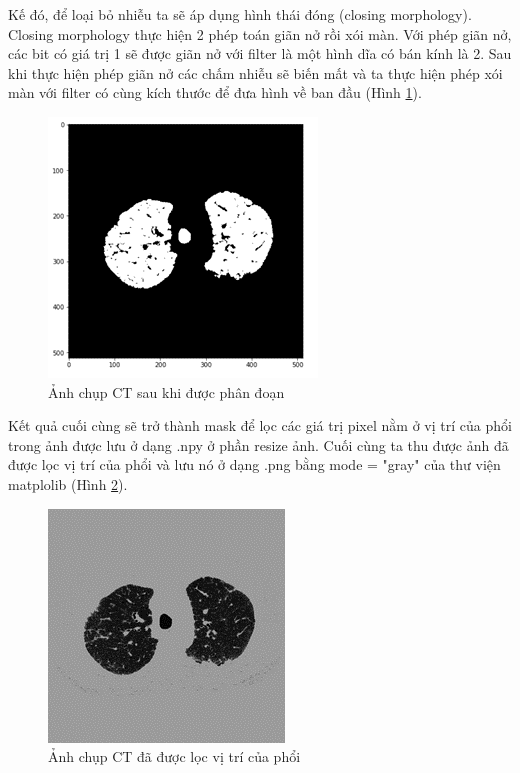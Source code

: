 Kế đó, để loại bỏ nhiễu ta sẽ áp dụng hình thái đóng (closing morphology). Closing morphology thực hiện 2 phép toán giãn nở rồi xói màn. Với phép giãn nở, các bit có giá trị 1 sẽ được giãn nở với filter là một hình dĩa có bán kính là 2. Sau khi thực hiện phép giãn nở các chấm nhiễu sẽ biến mất và ta thực hiện phép xói màn với filter có cùng kích thước để đưa hình về ban đầu (Hình \ref{fig:data9}).\par
\begin{figure}[ht!]
\centerline{\includegraphics[scale=0.6]{images/data9.png}}
\caption{Ảnh chụp CT sau khi được phân đoạn}
\label{fig:data9}
\end{figure}
Kết quả cuối cùng sẽ trở thành mask để lọc các giá trị pixel nằm ở vị trí của phổi trong ảnh được lưu ở dạng .npy ở phần resize ảnh. Cuối cùng ta thu được ảnh đã được lọc vị trí của phổi và lưu nó ở dạng .png bằng mode = "gray" của thư viện matplolib (Hình \ref{fig:data10}).
\begin{figure}[ht!]
\centerline{\includegraphics[scale=0.6]{images/data10.png}}
\caption{Ảnh chụp CT đã được lọc vị trí của phổi}
\label{fig:data10}
\end{figure}
